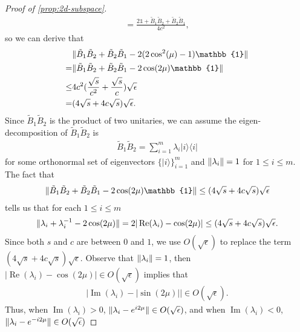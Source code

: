 \documentclass[11pt,letterpaper]{article}
\newcommand{\ket}[1]{|#1\rangle}
\newcommand{\ketbra}[2]{|#1\rangle\langle#2|}
\DeclarePairedDelimiter{\norm}{\lVert}{\rVert}
\renewcommand{\Re}{\operatorname{Re}}
\renewcommand{\Im}{\operatorname{Im}}
\DeclareMathOperator{\spn}{span}
\newcommand{\1}{\mathbb{1}}
\newcommand{\tB}{\tilde{B}}
\newcommand{\tpsi}{\tilde{\psi}}
\theoremstyle{definition}
\begin{document}
\begin{proof}[Proof of \cref{prop:2d-subspace}]
\begin{align*}
		=\frac{2\1 + \tB_1\tB_2 + \tB_2\tB_1}{4c^2},
	\end{align*}
	so we can derive that 
	\begin{align*}
		&\norm{\tB_1\tB_2 + \tB_2\tB_1 - 2(2\cos^2(\mu)-1)\1} \\
		=& \norm{ \tB_1\tB_2 + \tB_2\tB_1 - 2 \cos(2\mu) \1} \\
		\leq& 4c^2(\frac{\sqrt{s}}{c^2}+ \frac{\sqrt{s}}{c})\sqrt{\epsilon} \\
		=& (4\sqrt{s} + 4c\sqrt{s})\sqrt{\epsilon}.
	\end{align*}
	Since $\tB_1\tB_2$ is the product of two unitaries,
	we can assume the eigen-decomposition of $\tB_1\tB_2$ is
	\begin{align}
		\tB_1\tB_2 = \sum_{i=1}^m \lambda_i \ketbra{i}{i}
	\end{align}
	for some orthonormal set of eigenvectors $\{ \ket{i} \}_{i=1}^m$
	and $\norm{\lambda_i} =1$ for $1 \leq i \leq m$.
	The fact that 
	\begin{align}
	\norm{ \tB_1\tB_2 + \tB_2\tB_1 - 2 \cos(2\mu) \1} \leq (4\sqrt{s} + 4c\sqrt{s})\sqrt{\epsilon}
	\end{align}
	tells us that for each $1 \leq i \leq m$
	\begin{align*}
		\norm{\lambda_i + \lambda_i^{-1}-2 \cos(2\mu)} = 2|\Re(\lambda_i)- \cos(2\mu)| \leq (4\sqrt{s} + 4c\sqrt{s})\sqrt{\epsilon}.
	\end{align*}
	Since both $s$ and $c$ are between $0$ and $1$, we use $O(\sqrt{\epsilon})$ to replace the term 
	$(4\sqrt{s} + 4c\sqrt{s})\sqrt{\epsilon}$.
	Observe that $\norm{\lambda_i} = 1$, then $| \Re(\lambda_i) - \cos(2\mu)| \in O(\sqrt{\epsilon})$ implies that 
	\begin{align}
		|\Im(\lambda_i) - |\sin(2\mu)|| \in O(\sqrt{\epsilon}).
	\end{align}
	Thus, when $\Im(\lambda_i) > 0$, $\norm{\lambda_i - e^{i 2\mu}} \in O(\sqrt{\epsilon})$, and
	when $\Im(\lambda_i) < 0$, $\norm{\lambda_i - e^{-i 2\mu}} \in O(\sqrt{\epsilon})$

\end{proof}
\end{document}
